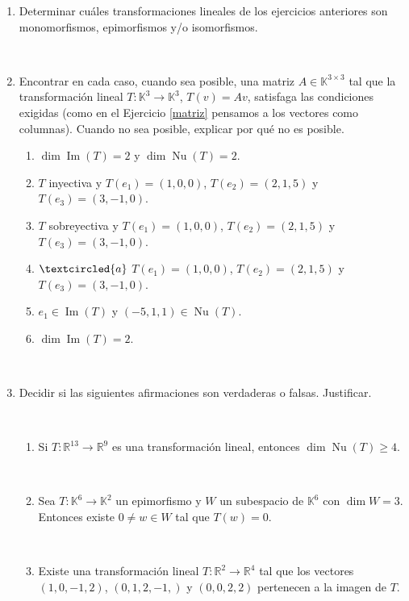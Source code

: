 \documentclass[12pt]{amsart}
\begin{document}
\begin{enumerate}[resume, topsep=5pt,itemsep=5pt]
\item Determinar cu\'ales transformaciones lineales de los ejercicios anteriores son monomorfismos, epimorfismos y/o isomorfismos.

\

\item Encontrar en cada caso, cuando sea posible, una matriz $A\in\mathbb{K}^{3\times 3}$ tal que la transformaci\'on lineal $T:\mathbb{K}^3\longrightarrow\mathbb{K}^3$, $T(v)=Av$, satisfaga las condiciones exigidas (como en el Ejercicio \eqref{matriz} pensamos a los vectores como columnas). 
	Cuando no sea posible, explicar por qu\'e no es posible.
	\begin{enumerate}[ topsep=5pt,itemsep=5pt]
		\item $\operatorname{dim} \operatorname{Im}(T)=2$ y $\operatorname{dim}\operatorname{Nu}(T)=2$.
		\item $T$ inyectiva y $T(e_1)=(1,0,0)$, $T(e_2)=(2,1,5)$ y $T(e_3)=(3,-1,0)$.
		\item $T$ sobreyectiva y $T(e_1)=(1,0,0)$, $T(e_2)=(2,1,5)$ y $T(e_3)=(3,-1,0)$.
		
		\item\label{usar Txyz} $\textcircled{a}$ $T(e_1)=(1,0,0)$, $T(e_2)=(2,1,5)$ y $T(e_3)=(3,-1,0)$.
		
		\item $e_1\in\operatorname{Im}(T)$ y $(-5,1,1)\in\operatorname{Nu}(T)$.
		
		\item $\operatorname{dim} \operatorname{Im}(T)=2$.
	\end{enumerate}
	
\

\item Decidir si las siguientes afirmaciones son verdaderas o falsas. Justificar.

\

\begin{enumerate}
\item  Si $T : \mathbb R^{13} \to \mathbb R^9$ es una transformaci\' on lineal, entonces $\dim \operatorname{Nu}(T) \geq  4$.

\

\item Sea $T:\mathbb{K}^{6}\longrightarrow\mathbb{K}^2$ un epimorfismo y $W$ un subespacio de $\mathbb{K}^{6}$ con $\dim W=3$. Entonces existe $0\neq w\in W$ tal que $T(w)=0$.

\

\item Existe una transformaci\' on lineal $T : \mathbb R^2 \to \mathbb R^4$ tal que los vectores $(1, 0, -1, 2)$, $(0, 1, 2,-1,)$ y $(0, 0, 2, 2)$ pertenecen a la imagen de $T$.


\end{enumerate}
\end{enumerate}
\end{document}
